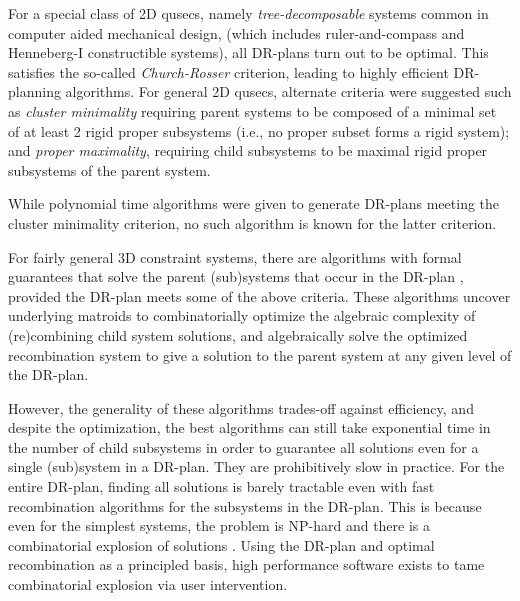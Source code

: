\medskip\noindent{}
For a special class of 2D qusecs, namely  {\em tree-decomposable} systems
\cite{XX} common in computer aided mechanical design,
(which includes ruler-and-compass and Henneberg-I constructible systems),
all DR-plans turn out to
be optimal. This satisfies the so-called {\em Church-Rosser} criterion,
leading to highly efficient DR-planning algorithms.
For general 2D qusecs, alternate criteria were suggested
such as {\em cluster minimality}
requiring parent systems to be composed of
a minimal set of at least 2 rigid proper subsystems (i.e., no proper
subset forms a rigid system);
and {\em proper maximality}, requiring child subsystems
to be maximal rigid proper subsystems of the parent system.

While polynomial time algorithms were given \cite{XX} to generate DR-plans
meeting the cluster minimality criterion,
no such algorithm is known for the latter criterion.


\medskip\noindent{}
For fairly general 3D constraint systems, there are algorithms with formal
guarantees that
solve the parent (sub)systems that occur in the DR-plan \cite{XX, XX,XX},
provided the DR-plan meets some of the above criteria.
These algorithms  uncover underlying matroids to combinatorially optimize
the algebraic complexity of (re)combining child system solutions,
and algebraically solve the optimized recombination system to give a
solution to the parent system at any
given level of the DR-plan.

However, the generality of these algorithms
trades-off against efficiency, and despite the optimization,
the best algorithms can still take
exponential time in the number of child subsystems in order to guarantee
all solutions even for a single (sub)system in a DR-plan. They
are prohibitively slow in practice. For the entire DR-plan, finding all
solutions is barely tractable even with fast recombination algorithms for
the subsystems in the DR-plan. This is because even for the simplest
systems, the problem is NP-hard \cite{XX} and there is a
combinatorial explosion of solutions \cite{XX}.  Using the DR-plan and
optimal recombination as a principled basis, high performance software
exists \cite{XX,XX} to
tame combinatorial explosion via user intervention.


